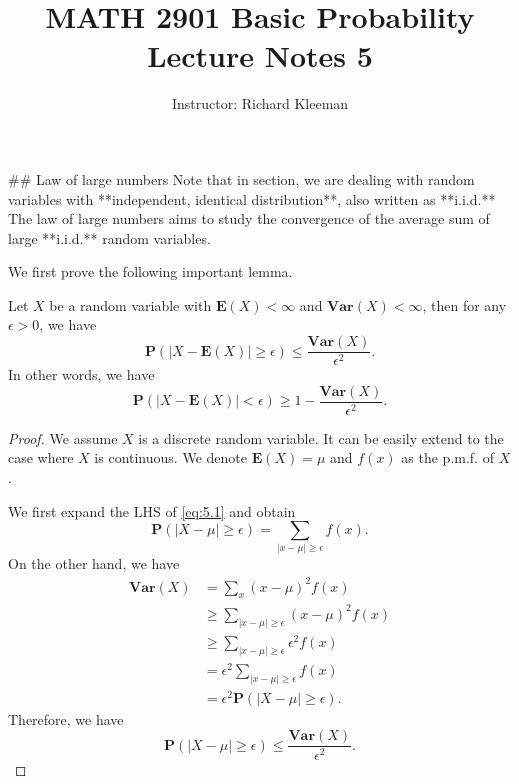 


\title{MATH 2901 Basic Probability Lecture Notes 5}
\author{Instructor: Richard Kleeman}
\date{}
\maketitle


## Law of large numbers
Note that in section, we are dealing with random variables with **independent, identical distribution**, also written as **i.i.d.** The law of large numbers aims to study the convergence of the average sum of large **i.i.d.** random variables.

We first prove the following important lemma.
\begin{lemma}
Let $X$ be a random variable with $\mathbf{E}(X) < \infty$ and $\mathbf{Var}(X) < \infty$, then for any $\epsilon > 0$, we have
\begin{equation}
    \label{eq:5.1}
    \tag{5-1}
    \mathbf{P}\left( \left\vert X-\mathbf{E}(X) \right\vert \geq \epsilon \right) \leq \frac{\mathbf{Var}(X)}{\epsilon^2}.
\end{equation}
In other words, we have
\begin{equation}
    \label{eq:5.2}
    \tag{5-2}
    \mathbf{P}(\left\vert X-\mathbf{E}(X) \right\vert < \epsilon) \geq 1-\frac{\mathbf{Var}(X)}{\epsilon^2}.
\end{equation}
\end{lemma}

\begin{proof}
We assume $X$ is a discrete random variable. It can be easily extend to the case where $X$ is continuous. We denote $\mathbf{E}(X) = \mu$ and $f(x)$ as the p.m.f. of $X$.

We first expand the LHS of \eqref{eq:5.1} and obtain
\begin{equation*}
    \mathbf{P}(\left\vert X-\mu \right\vert \geq \epsilon)  = \sum_{\left\vert x-\mu \right\vert\geq \epsilon} f(x).
\end{equation*}
On the other hand, we have
\begin{equation*}
    \begin{split}
        \mathbf{Var}(X) &= \sum_{x} (x-\mu)^2 f(x) \\
        &\geq \sum_{\left\vert x-\mu \right\vert \geq \epsilon} (x-\mu)^2 f(x) \\
        &\geq \sum_{\left\vert x-\mu \right\vert \geq \epsilon} \epsilon^2 f(x) \\
        &= \epsilon^2 \sum_{\left\vert x-\mu \right\vert \geq \epsilon} f(x) \\ &= \epsilon^2 \mathbf{P}(\left\vert X-\mu \right\vert \geq \epsilon).
    \end{split}
\end{equation*}
Therefore, we have 
\begin{equation*}
    \mathbf{P}(\left\vert X-\mu \right\vert \geq \epsilon) \leq \frac{\mathbf{Var}(X)}{\epsilon^2}.
\end{equation*}
\end{proof}

